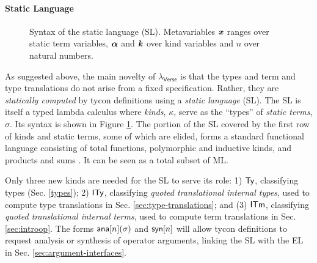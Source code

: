 \documentclass[preprint]{sigplanconf}
\begin{document}
\paragraph{Static Language}
\begin{figure}[t]
\small
\hspace{-5px}
\caption{Syntax of the static language (SL). Metavariables ${\textbf{\textit{x}}}$ ranges over static term variables, $\boldsymbol{\alpha}$ and $\textbf{\textit{k}}$ over kind variables and $n$ over natural numbers.}\vspace{-10px}
\label{syntax-SL}
\end{figure}
As suggested above, the main novelty of $\lambda_\textsf{Verse}$ is that the types and term and type translations do not arise from a fixed specification. Rather, they are \emph{statically computed} by tycon definitions using a \emph{static language} (SL). The SL is itself a typed lambda calculus where  
\emph{kinds}, $\kappa$, serve as the ``types'' of \emph{static terms}, $\sigma$.  Its syntax is shown in Figure \ref{syntax-SL}. The portion of the SL covered by the first row of kinds and static terms, some of which are elided, forms a standard functional language consisting of total functions, polymorphic and inductive kinds, and products and sums  \cite{pfpl}. It can be seen as a total subset of ML.%

Only three new  kinds are needed for the SL to serve its role: 1) ${\sf Ty}$, classifying types (Sec. \ref{types}); 2) ${\sf ITy}$, classifying \emph{quoted translational internal types}, used to {compute} type translations in Sec. \ref{sec:type-translations}; and (3) ${\sf ITm}$, classifying \emph{quoted translational internal terms}, used to {compute} term translations in Sec. \ref{sec:introop}. The forms ${\sf ana}[n](\sigma)$ and ${\sf syn}[n]$ will  allow tycon definitions to request analysis or synthesis of operator arguments, linking the SL with the  EL in Sec. \ref{sec:argument-interfaces}.
\end{document}
